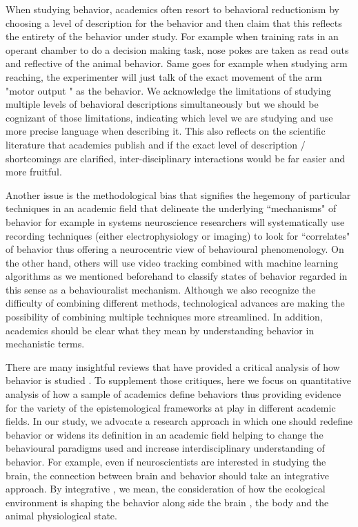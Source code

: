 \documentclass[a4paper, 11pt]{article}
\begin{document}
When studying behavior, academics often resort to behavioral reductionism by choosing a level of description for the behavior and then claim that this reflects the entirety of the behavior under study. For example when training rats in an operant chamber to do a decision making task, nose pokes are taken as read outs and reflective of the animal behavior. Same goes for example when studying arm reaching, the experimenter will just talk of the exact movement of the arm "motor output " as the behavior. We acknowledge the limitations of studying multiple levels of behavioral descriptions simultaneously but we should be cognizant of those limitations, indicating which level we are studying and use more precise language when describing it. This also reflects on the scientific literature that academics publish and if the exact level of description / shortcomings are clarified, inter-disciplinary interactions would be far easier and more fruitful. 

Another issue is the methodological bias that signifies the hegemony of particular techniques in an academic field that delineate the underlying ``mechanisms" of behavior for example in systems neuroscience researchers will systematically use recording techniques (either electrophysiology or imaging) to look for ``correlates" of behavior thus offering a neurocentric view of behavioural phenomenology. On the other hand, others will use video tracking combined with machine learning algorithms as we mentioned beforehand to classify states of behavior regarded in this sense as a behaviouralist mechanism. Although we also recognize the difficulty of combining different methods, technological advances are making the possibility of combining multiple techniques more streamlined. In addition, academics should be clear what they mean by understanding behavior in mechanistic terms. 


There are many insightful reviews that have provided a critical analysis of how behavior is studied \cite{gomez2019life, krakauer2017neuroscience}. To supplement those critiques, here we focus on quantitative analysis of how a sample of academics define behaviors thus providing evidence for the variety of the epistemological frameworks at play in different academic fields. In our study, we advocate a research approach in which one should redefine behavior or  widens its definition in an academic field helping to change the behavioural paradigms used and increase interdisciplinary understanding of behavior.  For example, even if neuroscientists are interested in studying the brain, the connection between brain and behavior should take an integrative approach. By integrative , we mean, the consideration of how the ecological environment is shaping the behavior along side the brain , the body and the animal physiological state. 
\end{document}
